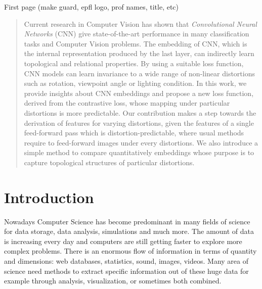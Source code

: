 \documentclass[a4paper,12pt]{report}
\begin{document}
\thispagestyle{empty}
First page (make guard, epfl logo, prof names, title, etc)

\newpage
\begin{abstract}
    Current research in Computer Vision has shown that {\em Convolutional Neural Networks} (CNN) give state-of-the-art performance in many classification tasks and Computer Vision problems\cite{mnist_web}\cite{krizhevsky2012imagenet}\cite{rowley1998neural}\cite{prechelt1994proben1}.
    The embedding of CNN, which is the internal representation produced by the last layer, can indirectly learn topological and relational properties.
    By using a suitable loss function, CNN models can learn invariance to a wide range of non-linear distortions such as rotation, viewpoint angle or lighting condition.
    In this work, we provide insights about CNN embeddings and propose a new loss function, derived from the contrastive loss, whose mapping under particular distortions is more predictable.
    Our contribution makes a step towards the derivation of features for varying distortions, given the features of a single feed-forward pass which is distortion-predictable, where usual methods require to feed-forward images under every distortions.
    We also introduce a simple method to compare quantitatively embeddings whose purpose is to capture topological structures of particular distortions.
\end{abstract}

\tableofcontents


\chapter{Introduction}

Nowadays Computer Science has become predominant in many fields of science for data storage, data analysis, simulations and much more.
The amount of data is increasing every day and computers are still getting faster to explore more complex problems.
There is an enormous flow of information in terms of quantity and dimensions: web databases, statistics, sound, images, videos.
Many area of science need methods to extract specific information out of these huge data for example through analysis, visualization, or sometimes both combined.
\end{document}
